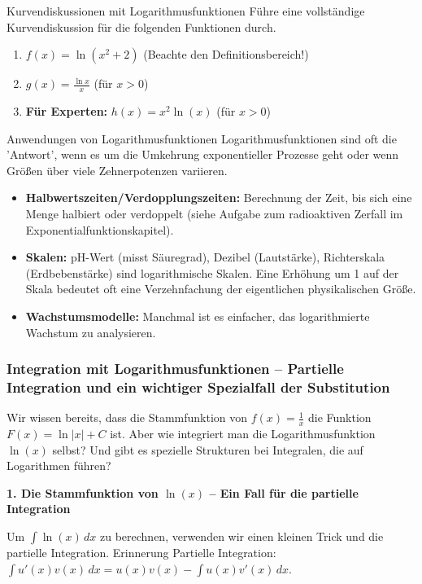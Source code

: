 \begin{aufgabenumgebung}{Kurvendiskussionen mit Logarithmusfunktionen}
Führe eine vollständige Kurvendiskussion für die folgenden Funktionen durch.
\begin{enumerate}
    \item $f(x) = \ln(x^2+2)$ (Beachte den Definitionsbereich!)
    \item $g(x) = \frac{\ln x}{x}$ (für $x>0$)
    \item \textbf{Für Experten:} $h(x) = x^2 \ln(x)$ (für $x>0$)
\end{enumerate}
\end{aufgabenumgebung}

\begin{tippumgebung}{Anwendungen von Logarithmusfunktionen}
Logarithmusfunktionen sind oft die 'Antwort', wenn es um die Umkehrung exponentieller Prozesse geht oder wenn Größen über viele Zehnerpotenzen variieren.
\begin{itemize}
    \item \textbf{Halbwertszeiten/Verdopplungszeiten:} Berechnung der Zeit, bis sich eine Menge halbiert oder verdoppelt (siehe Aufgabe zum radioaktiven Zerfall im Exponentialfunktionskapitel).
    \item \textbf{Skalen:} pH-Wert (misst Säuregrad), Dezibel (Lautstärke), Richterskala (Erdbebenstärke) sind logarithmische Skalen. Eine Erhöhung um 1 auf der Skala bedeutet oft eine Verzehnfachung der eigentlichen physikalischen Größe.
    \item \textbf{Wachstumsmodelle:} Manchmal ist es einfacher, das logarithmierte Wachstum zu analysieren.
\end{itemize}
\end{tippumgebung}

\subsubsection{Integration mit Logarithmusfunktionen – Partielle Integration und ein wichtiger Spezialfall der Substitution}
\label{subsubsec:integration_lnx_neu}

Wir wissen bereits, dass die Stammfunktion von $f(x)=\frac{1}{x}$ die Funktion $F(x)=\ln|x|+C$ ist. Aber wie integriert man die Logarithmusfunktion $\ln(x)$ selbst? Und gibt es spezielle Strukturen bei Integralen, die auf Logarithmen führen?

\textbf{1. Die Stammfunktion von $\ln(x)$ – Ein Fall für die partielle Integration}

Um $\int \ln(x) \,dx$ zu berechnen, verwenden wir einen kleinen Trick und die partielle Integration.
Erinnerung Partielle Integration: $\int u'(x)v(x) \,dx = u(x)v(x) - \int u(x)v'(x) \,dx$.

